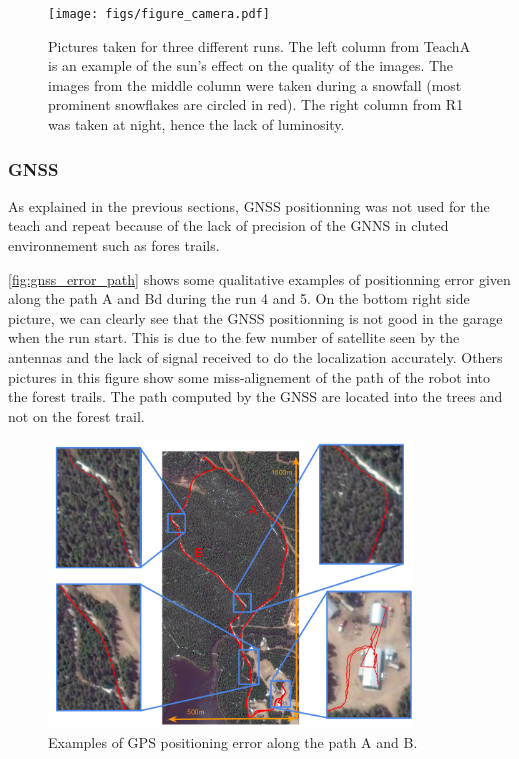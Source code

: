 \begin{figure} [htpb]
	\centering
	\texttt{[image: figs/figure\_camera.pdf]}
	\caption{Pictures taken for three different runs. The left column from TeachA is an example of the sun's effect on the quality of the images. The images from the middle column were taken during a snowfall (most prominent snowflakes are circled in red). The right column from R1 was taken at night, hence the lack of luminosity.}
	\label{fig:cameras_expo}
\end{figure}

\subsubsection{GNSS}
\label{sec:res_gnss}

As explained in the previous sections, \ac{GNSS} positionning was not used for the teach and repeat because of the lack of precision of the \ac{GNNS} in cluted environnement such as fores trails.

\autoref{fig:gnss_error_path} shows some qualitative examples of positionning error given along the path A and Bd during the run 4 and 5.
On the bottom right side picture, we can clearly see that the \ac{GNSS} positionning is not good in the garage when the run start. 
This is due to the few number of satellite seen by the antennas and the lack of signal received to do the localization accurately.
Others pictures in this figure show some miss-alignement of the path of the robot into the forest trails.
The path computed by the \ac{GNSS} are located into the trees and not on the forest trail.

\begin{figure} [htpb]
	\centering
	\includegraphics[height=3.0in]{./figs/GPS/FR_gps_data_fails2.pdf}
	\caption{Examples of GPS positioning error along the path A and B.}
	\label{fig:gnss_error_path}
\end{figure}

